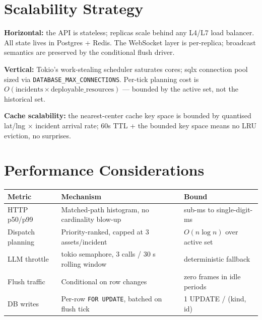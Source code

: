 \documentclass[10pt,letterpaper]{article}
\begin{document}
\section{Scalability Strategy}
\begin{tightemize}
    \item \textbf{Horizontal:} the API is stateless; replicas scale behind any L4/L7 load balancer. All state lives in Postgres + Redis. The WebSocket layer is per-replica; broadcast semantics are preserved by the conditional flush driver.
    \item \textbf{Vertical:} Tokio's work-stealing scheduler saturates cores; sqlx connection pool sized via \texttt{DATABASE\_MAX\_CONNECTIONS}. Per-tick planning cost is $O(\text{incidents} \times \text{deployable\_resources})$ --- bounded by the active set, not the historical set.
    \item \textbf{Cache scalability:} the nearest-center cache key space is bounded by quantised lat/lng $\times$ incident arrival rate; 60s TTL + the bounded key space means no LRU eviction, no surprises.
\end{tightemize}

\section{Performance Considerations}
\begin{center}
\renewcommand{\arraystretch}{1.2}
\footnotesize
\begin{tabularx}{\textwidth}{@{}lXl@{}}
\toprule
\textbf{Metric} & \textbf{Mechanism} & \textbf{Bound}\\
\midrule
HTTP p50/p99 & Matched-path histogram, no cardinality blow-up & sub-ms to single-digit-ms\\
Dispatch planning & Priority-ranked, capped at 3 assets/incident & $O(n \log n)$ over active set\\
LLM throttle & tokio semaphore, 3 calls / 30 s rolling window & deterministic fallback\\
Flush traffic & Conditional on row changes & zero frames in idle periods\\
DB writes & Per-row \texttt{FOR UPDATE}, batched on flush tick & 1 UPDATE / (kind, id)\\
\bottomrule
\end{tabularx}
\end{center}
\end{document}
